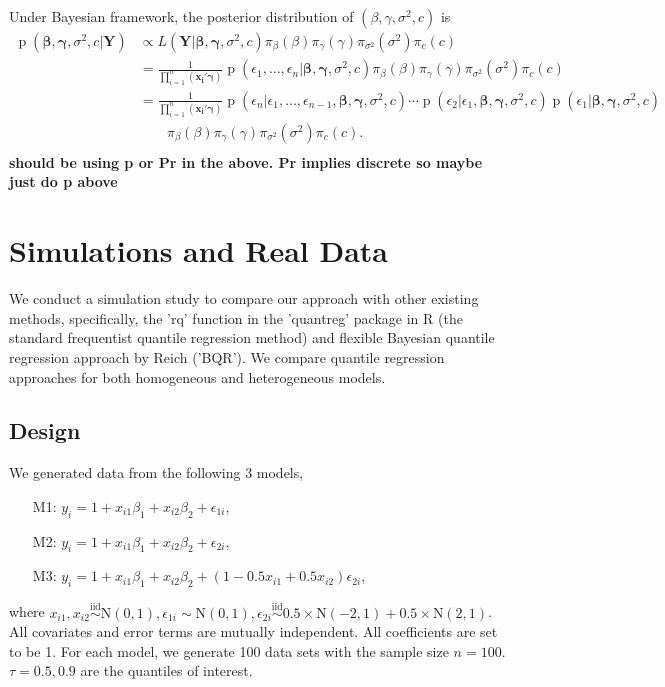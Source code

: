 \documentclass[12pt]{article}
\DeclareMathOperator{\pr}{p}
\begin{document}
Under Bayesian framework, the posterior distribution of $(\beta,
\gamma, \sigma^2, c)$ is 
\begin{align*}
  \pr(\bm{\beta}, \bm{\gamma}, \sigma^2, c|\bm{Y}) & \propto L(\bm{Y}|
  \bm{\beta}, \bm{\gamma}, \sigma^2, c) \pi_{\beta}(\beta)
  \pi_{\gamma}(\gamma) \pi_{\sigma^2}(\sigma^2) \pi_c(c) \\
  & = \frac{1}{\prod_{i=1}^n (\bm{x_i'\gamma})} \pr \left( \epsilon_1,
    \ldots, \epsilon_n | \bm{\beta}, \bm{\gamma}, \sigma^2, c\right)
  \pi_{\beta}(\beta)
  \pi_{\gamma}(\gamma) \pi_{\sigma^2}(\sigma^2) \pi_c(c) \\
  & = \frac{1}{\prod_{i=1}^n (\bm{x_i'\gamma})} \pr \left(\epsilon_n| \epsilon_1,
    \ldots, \epsilon_{n-1} , \bm{\beta}, \bm{\gamma}, \sigma^2, c\right)
  \cdots  \pr \left(\epsilon_2| \epsilon_1, \bm{\beta}, \bm{\gamma},
    \sigma^2, c\right)  \pr \left(\epsilon_1| \bm{\beta}, \bm{\gamma},
    \sigma^2, c\right)\\
  & \qquad 
  \pi_{\beta}(\beta)
  \pi_{\gamma}(\gamma) \pi_{\sigma^2}(\sigma^2) \pi_c(c) .\\
\end{align*}
{\bf should be using p or Pr in the above.  Pr implies discrete so
  maybe just do p above}

\section{Simulations and Real Data}
We
conduct a simulation study to compare our approach with other existing
methods, specifically, the 'rq' function in the 'quantreg' package in
R 
(the standard frequentist quantile regression method) and 
flexible Bayesian quantile regression approach by Reich
('BQR'). 
We compare quantile regression approaches
for both homogeneous and heterogeneous models. 

\subsection{Design}
We generated data from the following 3 models,
\begin{itemize}
\item [M1:] $y_i = 1 + x_{i1}\beta_1 + x_{i2}\beta_2 + \epsilon_{1i}$,
\item [M2:] $y_i = 1 + x_{i1}\beta_1 + x_{i2}\beta_2 + \epsilon_{2i}$,
\item [M3:]  $y_i = 1 + x_{i1}\beta_1 + x_{i2}\beta_2 +
  (1-0.5x_{i1}+0.5x_{i2}) \epsilon_{2i}$, 
\end{itemize}
where $x_{i1} , x_{i2} \stackrel{\text{iid}}{\sim} \mathrm{N}(0,1),
\epsilon_{1i} \sim \mathrm{N}(0,1), \epsilon_{2i} 
\stackrel{\text{iid}}{\sim} 0.5 \times \mathrm{N}(-2,1) + 
0.5 \times \mathrm{N}(2,1)
$. All covariates and error terms are mutually independent. All
coefficients are set to be 1. For each model, we generate 100 data
sets with the sample size $n=100$. $\tau=0.5, 0.9$ are the quantiles
of interest.  
\end{document}
